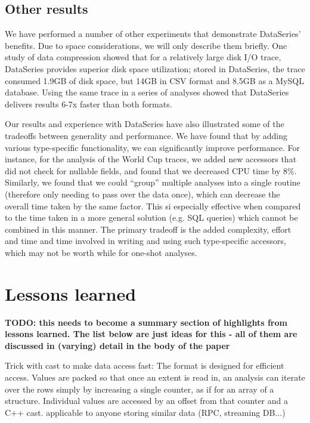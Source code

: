 \documentclass{acm_proc_article-sp}
\begin{document}
\subsection{Other results}\label{sec:otherresults}

We have performed a number of other experiments that demonstrate
DataSeries' benefits. Due to space considerations, we will only
describe them briefly. One study of data compression showed that for a
relatively large disk I/O trace, DataSeries provides superior disk
space utilization; stored in DataSeries, the trace consumed 1.9GB of
disk space, but 14GB in CSV format and 8.5GB as a MySQL
database. Using the same trace in a series of analyses showed that
DataSeries delivers results 6-7x faster than both formats.

Our results and experience with DataSeries have also illustrated some
of the tradeoffs between generality and performance. We have found
that by adding various type-specific functionality, we can
significantly improve performance. For instance, for the analysis of
the World Cup traces, we added new accessors that did not check for
nullable fields, and found that we decreased CPU time by
8\%. Similarly, we found that we could ``group'' multiple analyses
into a single routine (therefore only needing to pass over the data
once), which can decrease the overall time taken by the same
factor. This si especially effective when compared to the time taken
in a more general solution (e.g. SQL queries) which cannot be combined
in this manner. The primary tradeoff is the added complexity, effort
and time and time involved in writing and using such type-specific
accessors, which may not be worth while for one-shot analyses.


\iffalse

\section{Lessons learned}\label{sec:lessonslearned}

{\bf TODO: this needs to become a summary section of highlights from lessons
learned. The list below are just ideas for this - all of them are discussed
in (varying) detail in the body of the paper}

Trick with cast to make data access fast: The format is designed for
efficient access. Values are packed so that once an extent is read in,
an analysis can iterate over the rows simply by increasing a single
counter, as if for an array of a structure.  Individual values are
accessed by an offset from that counter and a C++ cast.  applicable to
anyone storing similar data (RPC, streaming DB...)
\end{document}
